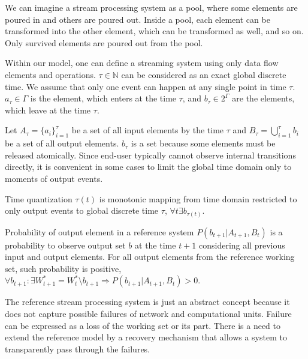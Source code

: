 We can imagine a stream processing system as a pool, where some elements are poured in and others are poured out. Inside a pool, each element can be transformed into the other element, which can be transformed as well, and so on. Only survived elements are poured out from the pool. 

Within our model, one can define a streaming system using only data flow elements and operations. $\tau\in{\mathbb{N}}$ can be considered as an exact global discrete time. We assume that only one event can happen at any single point in time $\tau$. $a_\tau\in{\Gamma}$ is the element, which enters at the time $\tau$, and $b_\tau\in{2^\Gamma}$ are the elements, which leave at the time $\tau$. 

Let $A_{\tau}=\{a_i\}^{\tau}_{i=1}$ be a set of all input elements by the time $\tau$ and ${B}_\tau=\bigcup\limits_{i=1}^{\tau}{b_i}$ be a set of all output elements. $b_\tau$ is a set because some elements must be released atomically. Since end-user typically cannot observe internal transitions directly, it is convenient in some cases to limit the global time domain only to moments of output events.

\begin{definition}{Time quantization}
$\tau(t)$ is monotonic mapping from time domain restricted to only output events to global discrete time $\tau$, $\forall{t}\exists{b_{\tau(t)}}$.
\end{definition}

\begin{definition}{Probability of output element in a reference system}
$P(b_{t+1}|A_{t+1}, B_t)$ is a probability to observe output set $b$ at the time $t+1$ considering all previous input and output elements. For all output elements from the reference working set, such probability is positive,\\
$\forall{b_{t+1}:\exists{W^{*}_{t+1}=W^{*}_{t}\setminus{b_{t+1}}}} \Rightarrow P(b_{t+1}|A_{t+1}, B_t) > 0$.
\end{definition}

The reference stream processing system is just an abstract concept because it does not capture possible failures of network and computational units. Failure can be expressed as a loss of the working set or its part. There is a need to extend the reference model by a recovery mechanism that allows a system to transparently pass through the failures.


